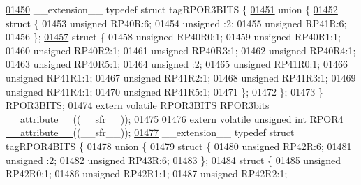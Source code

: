 \begin{DoxyCode}
\hypertarget{a00015_source_l01450}{}\hyperlink{a00014}{01450} \_\_extension\_\_ \textcolor{keyword}{typedef} \textcolor{keyword}{struct }tagRPOR3BITS \{
\hypertarget{a00015_source_l01451}{}\hyperlink{a00015}{01451}   \textcolor{keyword}{union }\{
\hypertarget{a00015_source_l01452}{}\hyperlink{a00015}{01452}     \textcolor{keyword}{struct }\{
01453       \textcolor{keywordtype}{unsigned} RP40R:6;
01454       \textcolor{keywordtype}{unsigned} :2;
01455       \textcolor{keywordtype}{unsigned} RP41R:6;
01456     \};
\hypertarget{a00015_source_l01457}{}\hyperlink{a00015}{01457}     \textcolor{keyword}{struct }\{
01458       \textcolor{keywordtype}{unsigned} RP40R0:1;
01459       \textcolor{keywordtype}{unsigned} RP40R1:1;
01460       \textcolor{keywordtype}{unsigned} RP40R2:1;
01461       \textcolor{keywordtype}{unsigned} RP40R3:1;
01462       \textcolor{keywordtype}{unsigned} RP40R4:1;
01463       \textcolor{keywordtype}{unsigned} RP40R5:1;
01464       \textcolor{keywordtype}{unsigned} :2;
01465       \textcolor{keywordtype}{unsigned} RP41R0:1;
01466       \textcolor{keywordtype}{unsigned} RP41R1:1;
01467       \textcolor{keywordtype}{unsigned} RP41R2:1;
01468       \textcolor{keywordtype}{unsigned} RP41R3:1;
01469       \textcolor{keywordtype}{unsigned} RP41R4:1;
01470       \textcolor{keywordtype}{unsigned} RP41R5:1;
01471     \};
01472   \};
01473 \} \hyperlink{a00014_d8/d4e/a00754}{RPOR3BITS};
01474 \textcolor{keyword}{extern} \textcolor{keyword}{volatile} \hyperlink{a00014_d8/d4e/a00754}{RPOR3BITS} RPOR3bits \hyperlink{a00015_a493c46f03454991ccc5aa7a6e1dfb2a7}{\_\_attribute\_\_}((\_\_sfr\_\_));
01475 
01476 \textcolor{keyword}{extern} \textcolor{keyword}{volatile} \textcolor{keywordtype}{unsigned} \textcolor{keywordtype}{int}  RPOR4 \hyperlink{a00015_a493c46f03454991ccc5aa7a6e1dfb2a7}{\_\_attribute\_\_}((\_\_sfr\_\_));
\hypertarget{a00015_source_l01477}{}\hyperlink{a00014}{01477} \_\_extension\_\_ \textcolor{keyword}{typedef} \textcolor{keyword}{struct }tagRPOR4BITS \{
\hypertarget{a00015_source_l01478}{}\hyperlink{a00015}{01478}   \textcolor{keyword}{union }\{
\hypertarget{a00015_source_l01479}{}\hyperlink{a00015}{01479}     \textcolor{keyword}{struct }\{
01480       \textcolor{keywordtype}{unsigned} RP42R:6;
01481       \textcolor{keywordtype}{unsigned} :2;
01482       \textcolor{keywordtype}{unsigned} RP43R:6;
01483     \};
\hypertarget{a00015_source_l01484}{}\hyperlink{a00015}{01484}     \textcolor{keyword}{struct }\{
01485       \textcolor{keywordtype}{unsigned} RP42R0:1;
01486       \textcolor{keywordtype}{unsigned} RP42R1:1;
01487       \textcolor{keywordtype}{unsigned} RP42R2:1;

\end{DoxyCode}
